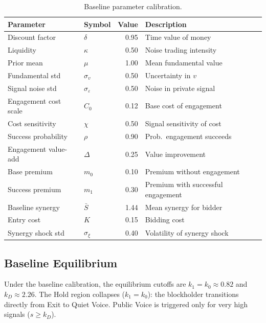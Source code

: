 \documentclass[11pt,a4paper]{article}
\newcommand{\1}{\mathbf{1}}
\begin{document}
\begin{table}[H]
\centering
\caption{Baseline parameter calibration.}
\label{tab:calibration}
\begin{tabular}{@{}llrl@{}}
\toprule
\textbf{Parameter} & \textbf{Symbol} & \textbf{Value} & \textbf{Description} \\
\midrule
Discount factor         & $\delta$        & 0.95  & Time value of money \\
Liquidity               & $\kappa$        & 0.50  & Noise trading intensity \\
Prior mean              & $\mu$           & 1.00  & Mean fundamental value \\
Fundamental std         & $\sigma_v$      & 0.50  & Uncertainty in $v$ \\
Signal noise std        & $\sigma_\varepsilon$ & 0.50  & Noise in private signal \\
Engagement cost scale   & $C_0$           & 0.12  & Base cost of engagement \\
Cost sensitivity        & $\chi$          & 0.50  & Signal sensitivity of cost \\
Success probability     & $\rho$          & 0.90  & Prob.\ engagement succeeds \\
Engagement value-add    & $\Delta$        & 0.25  & Value improvement \\
Base premium            & $m_0$           & 0.10  & Premium without engagement \\
Success premium         & $m_1$           & 0.30  & Premium with successful engagement \\
Baseline synergy        & $\bar{S}$       & 1.44  & Mean synergy for bidder \\
Entry cost              & $K$             & 0.15  & Bidding cost \\
Synergy shock std       & $\sigma_\xi$    & 0.40  & Volatility of synergy shock \\
\bottomrule
\end{tabular}
\end{table}

\subsection{Baseline Equilibrium}

Under the baseline calibration, the equilibrium cutoffs are
$k_1 = k_0 \approx 0.82$ and $k_D \approx 2.26$.
The Hold region collapses ($k_1 = k_0$): the blockholder transitions
directly from Exit to Quiet Voice. Public Voice is triggered only
for very high signals ($s \geq k_D$).
\end{document}
